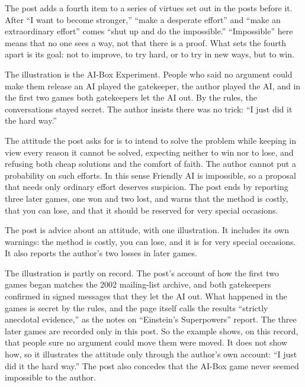 \begin{afterword}
\summaryhead

The post adds a fourth item to a series of virtues set out in the posts before it. After ``I want to become stronger,'' ``make a desperate effort'' and ``make an extraordinary effort'' comes ``shut up and do the impossible.'' ``Impossible'' here means that no one sees a way, not that there is a proof. What sets the fourth apart is its goal: not to improve, to try hard, or to try in new ways, but to win.

The illustration is the AI-Box Experiment. People who said no argument could make them release an AI played the gatekeeper, the author played the AI, and in the first two games both gatekeepers let the AI out. By the rules, the conversations stayed secret. The author insists there was no trick: ``I just did it the hard way.''

The attitude the post asks for is to intend to solve the problem while keeping in view every reason it cannot be solved, expecting neither to win nor to lose, and refusing both cheap solutions and the comfort of faith. The author cannot put a probability on such efforts. In this sense Friendly AI is impossible, so a proposal that needs only ordinary effort deserves suspicion. The post ends by reporting three later games, one won and two lost, and warns that the method is costly, that you can lose, and that it should be reserved for very special occasions.

\responsehead

The post is advice about an attitude, with one illustration. It includes its own warnings: the method is costly, you can lose, and it is for very special occasions. It also reports the author's two losses in later games.

The illustration is partly on record. The post's account of how the first two games began matches the 2002 mailing-list archive, and both gatekeepers confirmed in signed messages that they let the AI out. What happened in the games is secret by the rules, and the page itself calls the results ``strictly anecdotal evidence,'' as the notes on ``Einstein's Superpowers'' report. The three later games are recorded only in this post. So the example shows, on this record, that people sure no argument could move them were moved. It does not show how, so it illustrates the attitude only through the author's own account: ``I just did it the hard way.'' The post also concedes that the AI-Box game never seemed impossible to the author.


\end{afterword}
